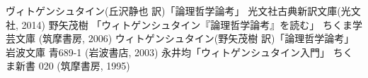 \documentclass[12pt]{jsarticle}
\begin{document}
\newpage
\begin{thebibliography}{9}
  ヴィトゲンシュタイン(丘沢静也 訳)「論理哲学論考」 光文社古典新訳文庫(光文社, 2014)
  野矢茂樹 「ウィトゲンシュタイン『論理哲学論考』を読む」 ちくま学芸文庫 (筑摩書房, 2006)
  ウィトゲンシュタイン(野矢茂樹 訳)「論理哲学論考」 岩波文庫 青689-1 (岩波書店, 2003)
  永井均「ウィトゲンシュタイン入門」 ちくま新書 020 (筑摩書房, 1995)
\end{thebibliography}
\end{document}
